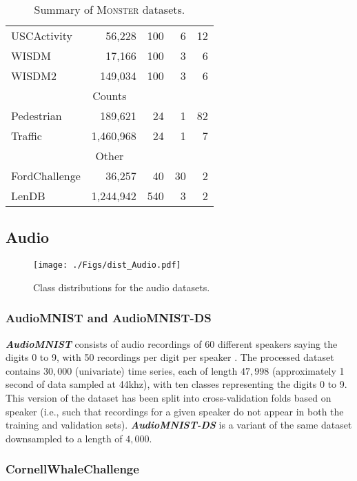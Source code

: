 \documentclass[twoside,11pt,preprint]{article}
\newcommand{\monster}{\textsc{Monster}}
\begin{document}
\begin{table}
\begin{tabular}{lrrrr}
        USCActivity & 56,228 & 100 & 6 & 12 \\
        WISDM & 17,166 & 100 & 3 & 6 \\
        WISDM2 & 149,034 & 100 & 3 & 6 \\
        \midrule
        \multicolumn{5}{c}{Counts} \\
        \midrule
        Pedestrian & 189{,}621 & 24 & 1 & 82 \\
        Traffic & 1{,}460{,}968 & 24 & 1 & 7 \\
        \midrule
        \multicolumn{5}{c}{Other} \\
        \midrule
        FordChallenge & 36,257 & 40 & 30 & 2 \\
        LenDB & 1{,}244{,}942 & 540 & 3 & 2 \\
        \bottomrule
    \end{tabular}
    \caption{Summary of {\monster} datasets.}
    \label{table:Datasets}
\end{table}

\subsection{Audio}

\begin{figure}[h]%
    \centering%
    \texttt{[image: ./Figs/dist\_Audio.pdf]}%
    \caption{Class distributions for the audio datasets.}%
    \label{fig-class-dist-audio}
\end{figure}%

\subsubsection{AudioMNIST and AudioMNIST-DS}

\textbf{\textit{AudioMNIST}} consists of audio recordings of 60 different speakers saying the digits 0 to 9, with 50 recordings per digit per speaker \citep{data_audiomnist_2024,becker_etal_2024}. The processed dataset contains $30{,}000$ (univariate) time series, each of length $47{,}998$ (approximately 1 second of data sampled at 44khz), with ten classes representing the digits 0 to 9. This version of the dataset has been split into cross-validation folds based on speaker (i.e., such that recordings for a given speaker do not appear in both the training and validation sets). \textbf{\textit{AudioMNIST-DS}} is a variant of the same dataset downsampled to a length of $4{,}000$.

\subsubsection{CornellWhaleChallenge}
\end{document}
